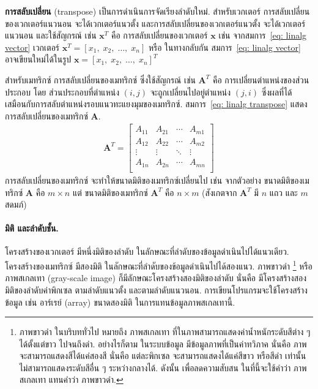 \textbf{การสลับเปลี่ยน} (transpose)
เป็นการดำเนินการจัดเรียงลำดับใหม่.
%
สำหรับเวกเตอร์
การสลับเปลี่ยนของเวกเตอร์แนวนอน จะได้เวกเตอร์แนวตั้ง
และการสลับเปลี่ยนของเวกเตอร์แนวตั้ง จะได้เวกเตอร์แนวนอน
และใช้สัญกรณ์ เช่น $\bm{x}^T$ คือ การสลับเปลี่ยนของเวกเตอร์ $\bm{x}$
เช่น จากสมการ~\ref{eq: linalg vector} เวกเตอร์ $\bm{x}^T = [x_1, \; x_2, \; \ldots, \; x_n]$
หรือ ในทางกลับกัน สมการ~\ref{eq: linalg vector} อาจเขียนใหม่ได้ในรูป
$\bm{x} = [x_1, \; x_2, \; \ldots, \; x_n]^T$

สำหรับเมทริกซ์ 
การสลับเปลี่ยนของเมทริกซ์ ซึ่งใช้สัญกรณ์ เช่น $\bm{A}^T$
คือ การเปลี่ยนตำแหน่งของส่วนประกอบ
โดย ส่วนประกอบที่ตำแหน่ง $(i,j)$ จะถูกเปลี่ยนไปอยู่ตำแหน่ง $(j,i)$
ซึ่งผลที่ได้เสมือนกับการสลับตำแหน่งรอบแนวทะแยงมุมของเมทริกซ์.
สมการ~\ref{eq: linalg transpose}
แสดงการสลับเปลี่ยนของเมทริกซ์ $\bm{A}$.
% 
\begin{eqnarray}
\bm{A}^T = \begin{bmatrix}
A_{11} & A_{21} & \cdots & A_{m1} \\
A_{12} & A_{22} & \cdots & A_{m2} \\
\vdots & \vdots & \ddots & \vdots \\
A_{1n} & A_{2n} & \cdots & A_{mn} \\
\end{bmatrix}
\label{eq: linalg transpose}
\end{eqnarray}
%
การสลับเปลี่ยนของเมทริกซ์ จะทำให้ขนาดมิติของเมทริกซ์เปลี่ยนไป
เช่น จากตัวอย่าง ขนาดมิติของเมทริกซ์ $\bm{A}$ คือ $m \times n$ 
แต่
ขนาดมิติของเมทริกซ์ $\bm{A}^T$ คือ $n \times m$ (สังเกตจาก $\bm{A}^T$ มี $n$ แถว และ $m$ สดมภ์)



\paragraph{มิติ และลำดับชั้น.}
โครงสร้างของเวกเตอร์ มีหนึ่งมิติของลำดับ ในลักษณะที่ลำดับของข้อมูลดำเนินไปได้แนวเดียว.
โครงสร้างของเมทริกซ์ มีสองมิติ ในลักษณะที่ลำดับของข้อมูลดำเนินไปได้สองแนว.
ภาพขาวดำ%
\footnote{%
ภาพขาวดำ ในบริบททั่วไป 
หมายถึง ภาพสเกลเทา
ที่ในภาพสามารถแสดงค่าน้ำหนักระดับสีต่าง ๆ ได้ตั้งแต่ขาว ไปจนถึงดำ.
อย่างไรก็ตาม
ในระบบข้อมูล มีข้อมูลภาพที่เป็นค่าทวิภาค
นั่นคือ 
ภาพจะสามารถแสดงสีได้แค่สองสี นั่นคือ แต่ละพิกเซล จะสามารถแสดงได้แค่สีขาว หรือสีดำ เท่านั้น ไม่สามารถแสดงระดับสีอื่น ๆ ระหว่างกลางได้.
ดังนั้น เพื่อลดความสับสน ในที่นี้จะใช้คำว่า ภาพสเกลเทา แทนคำว่า ภาพขาวดำ.
}%
หรือภาพสเกลเทา (gray-scale image) ก็มีลักษณะโครงสร้างสองมิติของลำดับ
นั่นคือ มีโครงสร้างสองมิติของลำดับค่าพิกเซล ตามลำดับแนวตั้ง และตามลำดับแนวนอน.
การเขียนโปรแกรมจะใช้โครงสร้างข้อมูล เช่น อาร์เรย์ (array) ขนาดสองมิติ ในการแทนข้อมูลภาพสเกลเทานี้.

